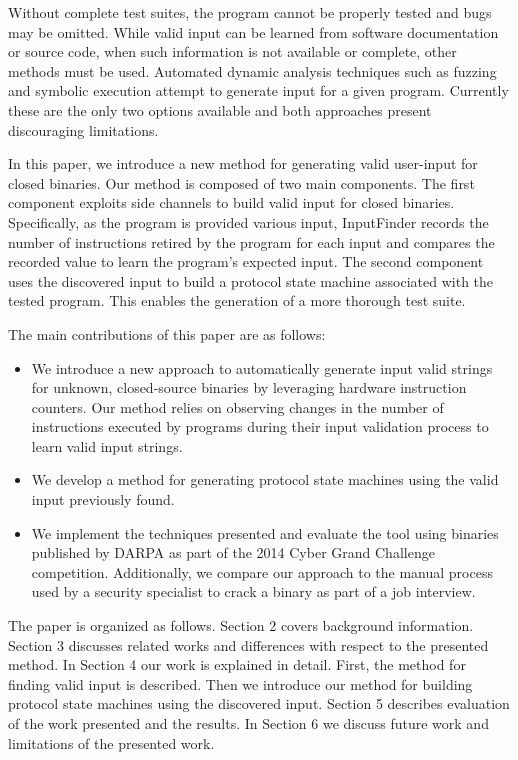 \documentclass[10pt,twocolumn]{article}
\def \tool {InputFinder}
\begin{document}
Without complete test suites, the program cannot be properly tested and bugs may be omitted.
While valid input can be learned from software documentation or source code, when such information is not available or complete, other methods must be used.
Automated dynamic analysis techniques such as fuzzing and symbolic execution attempt to generate input for a given program.
Currently these are the only two options available and both approaches present discouraging limitations.

In this paper, we introduce a new method for generating valid user-input for closed binaries. 
Our method is composed of two main components.
The first component exploits side channels to build valid input for closed binaries.
Specifically, as the program is provided various input, \tool{} records the number of instructions retired by the program for each input and compares the recorded value to learn the program's expected input.
The second component uses the discovered input to build a protocol state machine associated with the tested program.
This enables the generation of a more thorough test suite.


The main contributions of this paper are as follows:
\begin{itemize}
	\item We introduce a new approach to automatically generate input valid strings for unknown, closed-source binaries by leveraging hardware instruction counters. Our method relies on observing changes in the number of instructions executed by programs during their input validation process to learn valid input strings.
	\item We develop a method for generating protocol state machines using the valid input previously found.
	\item We implement the techniques presented and evaluate the tool using binaries published by DARPA as part of the 2014 Cyber Grand Challenge competition. Additionally, we compare our approach to the manual process used by a security specialist to crack a binary as part of a job interview.
\end{itemize}

The paper is organized as follows.
Section 2 covers background information.
Section 3 discusses related works and differences with respect to the presented method.
In Section 4 our work is explained in detail. First, the method for finding valid input is described. Then we introduce our method for building protocol state machines using the discovered input.
Section 5 describes evaluation of the work presented and the results.
In Section 6 we discuss future work and limitations of the presented work.
\end{document}
